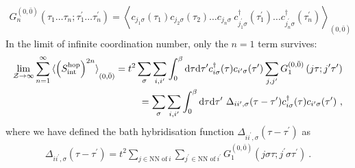 \documentclass[reprint,hidelinks]{revtex4-2}
\begin{document}
\begin{widetext}
\begin{equation}\begin{aligned}
	G_n^{(0,\bar 0)}\left(\tau_1\ldots \tau_n; \tau_1^\prime\ldots \tau_n^\prime\right) = \left<c_{j_1\sigma}(\tau_{1})c_{j_2\sigma}(\tau_{2})\ldots c_{j_n\sigma} ~ c^\dagger_{j_1^\prime\sigma}(\tau_{1}^\prime)\ldots c^\dagger_{j_n^\prime\sigma}(\tau_{n}^\prime) \right>_{(0,{\bar 0})} 
\end{aligned}\end{equation}
In the limit of infinite coordination number, only the \(n=1\) term survives:
\begin{equation}\begin{aligned}
	\lim_{\mathcal{Z}\to \infty}\sum_{n=1}^\infty \braket{\left(S_\text{int}^\text{hop}\right)^{2n}}_{(0,{\bar 0})} = t^2\sum_{\sigma}\sum_{i,i^\prime}\int_0^\beta\mathrm{d\tau}\mathrm{d\tau^\prime}c^\dagger_{i\sigma}(\tau)c_{i^\prime\sigma}(\tau^\prime)\sum_{j,j^\prime}G_1^{(0,\bar 0)}\left(j\tau; j^\prime\tau^\prime\right) \\
	= \sum_{\sigma}\sum_{i,i^\prime}\int_0^\beta\mathrm{d\tau}\mathrm{d\tau^\prime}~\Delta_{ii^\prime,\sigma}(\tau - \tau^\prime)c^\dagger_{i\sigma}(\tau)c_{i^\prime\sigma}(\tau^\prime)~,
\end{aligned}\end{equation}
where we have defined the bath hybridisation function \(\Delta_{ii^\prime,\sigma}(\tau - \tau^\prime)\) as
\begin{equation}\begin{aligned}
	\Delta_{ii^\prime,\sigma}(\tau - \tau^\prime) = t^2\sum_{j \in \text{NN of}~i}\sum_{j^\prime \in \text{NN of}~i^\prime}G_1^{(0,\bar 0)}\left(j\sigma\tau; j^\prime\sigma\tau^\prime\right)~.
\end{aligned}\end{equation}


\end{widetext}
\end{document}
